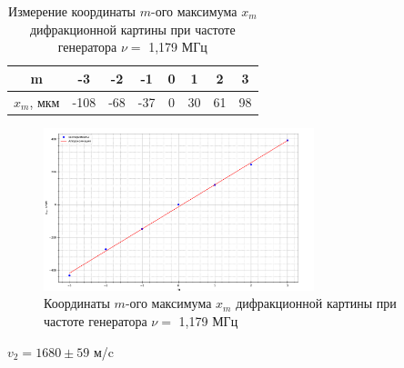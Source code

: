\documentclass[a4paper,12pt]{article}
\begin{document}
\begin{table}[!h]
\begin{center}
\begin{tabular}{|c|c|c|c|c|c|c|c|}
\hline
     m & -3 & -2& -1 & 0 & 1 & 2 & 3 \\ \hline
     $x_m$, мкм & -108 & -68 & -37 & 0 & 30 & 61 & 98  \\ \hline
\end{tabular}
\end{center}
\caption{Измерение координаты $ m $-ого максимума $ x_m $ дифракционной картины при частоте генератора $ \nu = $ 1,179 МГц}
\end{table}
\begin{figure}[h!]
		\centering	
		\includegraphics[width=0.7\textwidth]{graph2.png}
		\caption{Координаты $ m $-ого максимума $ x_m $ дифракционной картины при частоте генератора $ \nu = $ 1,179 МГц}
		\label{diff}
	\end{figure}
\begin{center}
    $v_2= 1680\pm 59$ м/c
\end{center}
\end{document}
